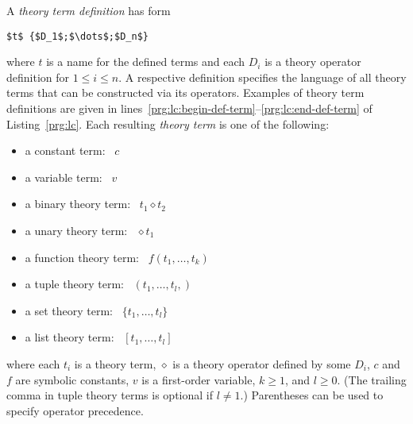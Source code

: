 A \emph{theory term definition} has form
\begin{lstlisting}[numbers=none,mathescape=t]
$t$ {$D_1$;$\dots$;$D_n$}
\end{lstlisting}
where $t$ is a name for the defined terms and each $D_i$ is a theory operator definition
for $1\leq i\leq n$.
A respective definition specifies the language of all theory terms
that can be constructed via %
its operators. %
%
Examples of theory term definitions are given in lines~\ref{prg:lc:begin-def-term}--\ref{prg:lc:end-def-term} of Listing~\ref{prg:lc}.
Each resulting \emph{theory term} is one of the following:
\par\medskip\noindent
\begin{minipage}{0.5\linewidth}
  \begin{itemize}
  \item a constant term: \ $c$
  \item a variable term: \ $v$
  \item a binary theory term: \  $t_1 \diamond t_2$
  \item a unary theory term: \  ${}\diamond t_1$
  \end{itemize}
\end{minipage}
\begin{minipage}{0.5\linewidth}
\begin{itemize}
  \item a function theory term: \  $f(t_1,\dots,t_k)$
  \item a tuple theory term: \  $(t_1,\dots,t_l,)$
  \item a set theory term: \  $\{t_1,\dots,t_l\}$
  \item a list theory term: \  $[t_1,\dots,t_l]$
\end{itemize}
\end{minipage}
\par\medskip\noindent
where each $t_i$ is a theory term,
$\diamond$ is a theory operator defined by some $D_i$,
$c$ and $f$ are symbolic constants,
$v$ is a first-order variable,
$k\geq 1$, and
$l\geq 0$.
(The trailing comma in tuple theory terms is optional if $l \neq 1$.)
Parentheses can be used to specify operator precedence.

